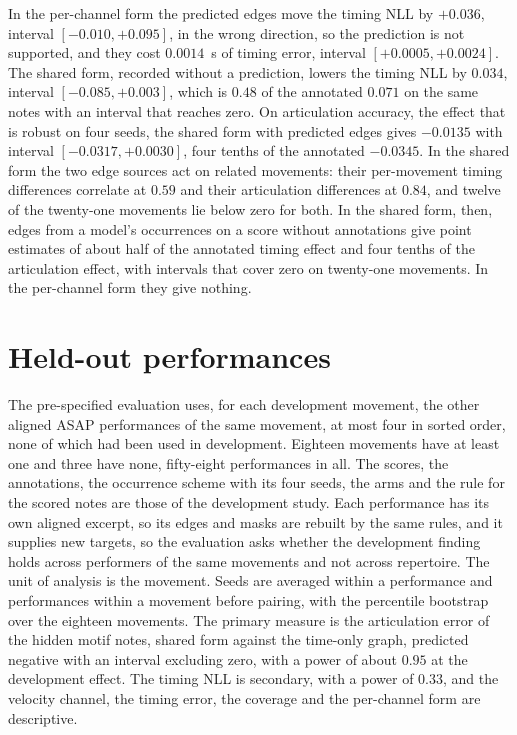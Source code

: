 \documentclass[11pt,a4paper]{report}
\begin{document}
In the per-channel form the predicted edges move the timing NLL by
$+0.036$, interval $[-0.010, +0.095]$, in the wrong direction, so the
prediction is not supported, and they cost $0.0014$~s of timing error,
interval $[+0.0005, +0.0024]$. The shared form, recorded without a
prediction, lowers the timing NLL by $0.034$, interval
$[-0.085, +0.003]$, which is $0.48$ of the annotated $0.071$ on the same
notes with an interval that reaches zero. On articulation accuracy, the
effect that is robust on four seeds, the shared form with predicted
edges gives $-0.0135$ with interval $[-0.0317, +0.0030]$, four tenths of
the annotated $-0.0345$. In the shared form the two edge sources act on
related movements: their per-movement timing differences correlate at
$0.59$ and their articulation differences at $0.84$, and twelve of the
twenty-one movements lie below zero for both. In the shared form,
then, edges from a model's occurrences on a score without annotations give
point estimates of about half of the annotated timing effect and four
tenths of the articulation effect, with intervals that cover zero on
twenty-one movements. In the per-channel form they give nothing.

\section{Held-out performances}\label{sec:motif-heldout}
The pre-specified evaluation uses, for each development movement, the
other aligned ASAP performances of the same movement, at most four in
sorted order, none of which had been used in development. Eighteen movements have at
least one and three have none, fifty-eight performances in all. The
scores, the annotations, the occurrence scheme with its four seeds, the
arms and the rule for the scored notes are those of the development
study. Each
performance has its own aligned excerpt, so its edges and masks are
rebuilt by the same rules, and it supplies new targets, so the evaluation
asks whether
the development finding holds across performers of the same movements and
not across repertoire. The unit of analysis is the movement. Seeds are averaged within a performance and
performances within a movement before pairing, with the percentile
bootstrap over the eighteen movements. The primary measure is the
articulation error of the hidden motif notes, shared form against the
time-only graph, predicted negative with an interval excluding zero, with a
power of about $0.95$ at the development effect. The timing NLL is
secondary, with a power of $0.33$, and the velocity channel, the timing
error, the coverage and the per-channel form are descriptive.
\end{document}
